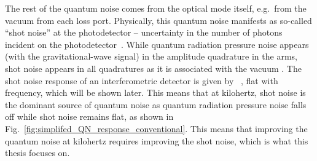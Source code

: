 The rest of the quantum noise comes from the optical mode itself, e.g.\ from the vacuum from each loss port. Physically, this quantum noise manifests as so-called ``shot noise'' at the photodetector -- uncertainty in the number of photons incident on the photodetector~\cite{}. While quantum radiation pressure noise appears (with the gravitational-wave signal) in the amplitude quadrature in the arms, shot noise appears in all quadratures as it is associated with the vacuum . The shot noise response of an interferometric detector is given by ~\cite{}, flat with frequency, which will be shown later. This means that at kilohertz, shot noise is the dominant source of quantum noise as quantum radiation pressure noise falls off while shot noise remains flat, as shown in Fig.~\ref{fig:simplifed_QN_response_conventional}. This means that improving the quantum noise at kilohertz requires improving the shot noise, which is what this thesis focuses on. 



